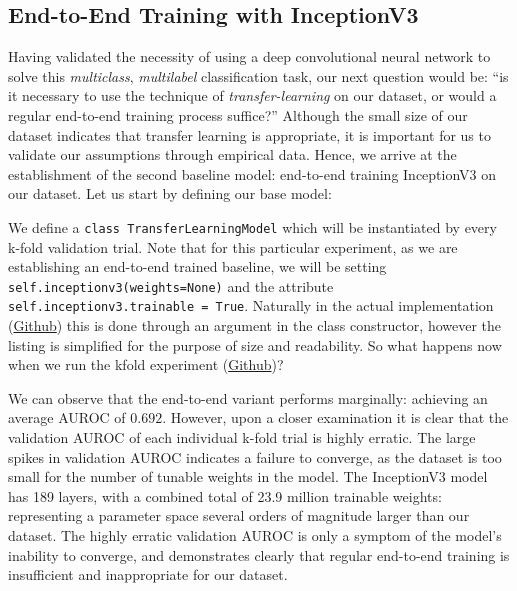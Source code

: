 \subsection{End-to-End Training with InceptionV3}

Having validated the necessity of using a deep convolutional neural network to solve this \emph{multiclass}, \emph{multilabel} classification task, our next question would be: \enquote{is it necessary to use the technique of \emph{transfer-learning} on our dataset, or would a regular end-to-end training process suffice?} Although the small size of our dataset indicates that transfer learning is appropriate, it is important for us to validate our assumptions through empirical data. Hence, we arrive at the establishment of the second baseline model: end-to-end training InceptionV3 on our dataset. Let us start by defining our base model:



\noindent
We define a \texttt{class TransferLearningModel} which will be instantiated by every k-fold validation trial. Note that for this particular experiment, as we are establishing an end-to-end trained baseline, we will be setting \texttt{self.inceptionv3(weights=None)} and the attribute \texttt{self.inceptionv3.trainable = True}. Naturally in the actual implementation (\href{https://github.com/ShenZhouHong/radiography-ai-project/blob/cf8c9e9a1f07849787a98b2fc51df690354bf194/python/common/model.py}{Github}) this is done through an argument in the class constructor, however the listing is simplified for the purpose of size and readability. So what happens now when we run the kfold experiment (\href{https://github.com/ShenZhouHong/radiography-ai-project/blob/ef29e4cb63fc38185b3bb45fc37027df3e385a44/python/initial-evaluation/inceptionv3-end2end.ipynb}{Github})?



\noindent
We can observe that the end-to-end variant performs marginally: achieving an average AUROC of \(0.692\). However, upon a closer examination it is clear that the validation AUROC of each individual k-fold trial is highly erratic. The large spikes in validation AUROC indicates a failure to converge, as the dataset is too small for the number of tunable weights in the model. The InceptionV3 model has 189 layers, with a combined total of 23.9 million trainable weights: representing a parameter space several orders of magnitude larger than our dataset. The highly erratic validation AUROC is only a symptom of the model's inability to converge, and demonstrates clearly that regular end-to-end training is insufficient and inappropriate for our dataset.

